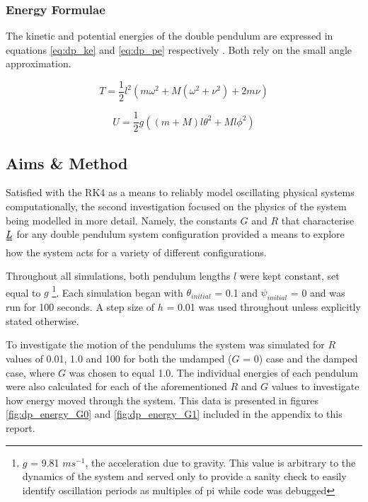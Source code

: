 \documentclass[11pt]{article}
\begin{document}
\subsubsection*{Energy Formulae}
The kinetic and potential energies of the double pendulum are expressed in equations \ref{eq:dp_ke} and \ref{eq:dp_pe} respectively \cite{dp energy formulae}. Both rely on the small angle approximation.

\begin{equation} \label{eq:dp_ke}
T = \frac{1}{2}l^2\left(m\omega^2 + M(\omega^2 + \nu^2) + 2m\nu \right)
\end{equation}

\begin{equation} \label{eq:dp_pe}
U = \frac{1}{2}g\left((m+M)l\theta^2 + Ml\phi^2 \right)
\end{equation}

\subsection{Aims \& Method}
Satisfied with the RK4 as a means to reliably model oscillating physical systems computationally, the second investigation focused on the physics of the system being modelled in more detail. Namely, the constants $G$ and $R$ that characterise $\uuline{L}$ for any double pendulum system configuration provided a means to explore how the system acts for a variety of different configurations.

Throughout all simulations, both pendulum lengths $l$ were kept constant, set equal to $g$ \footnote{$g$ = 9.81 $ms^{-1}$, the acceleration due to gravity. This value is arbitrary to the dynamics of the system and served only to provide a sanity check to easily identify oscillation periods as multiples of pi while code was debugged}. Each simulation began with $\theta_{initial}$ = 0.1 and $\psi_{initial}$ = 0 and was run for 100 seconds. A step size of $h$ = 0.01 was used throughout unless explicitly stated otherwise.

To investigate the motion of the pendulums the system was simulated for $R$ values of 0.01, 1.0 and 100 for both the undamped ($G$ = 0) case and the damped case, where $G$ was chosen to equal 1.0.
%
%
The individual energies of each pendulum were also calculated for each of the aforementioned $R$ and $G$ values to investigate how energy moved through the system. This data is presented in figures \ref{fig:dp_energy_G0} and \ref{fig:dp_energy_G1} included in the appendix to this report.
%
%
\end{document}
